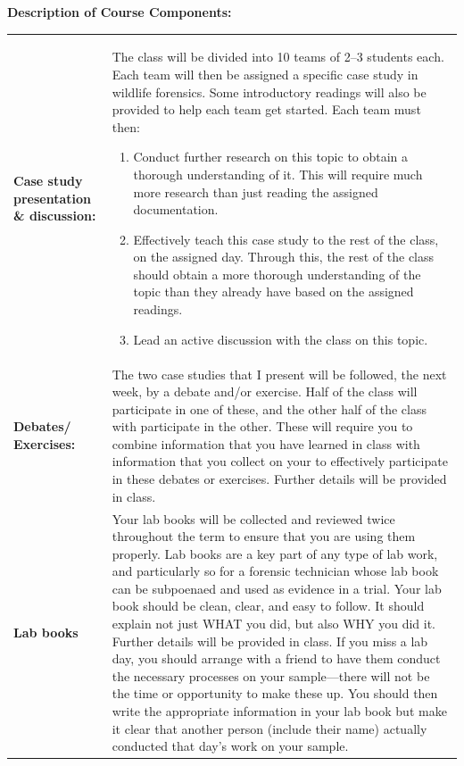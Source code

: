 \documentclass[hidelinks]{article}
\begin{document}
	\newpage
	\textbf{Description of Course Components:}
		\begin{table}[H]
			\begin{tabular}{@{} >{\raggedright}p{2.5cm} p{13.7cm}}
				\textbf{Case study presentation \& discussion:} & The class will be divided into 10 teams of 2--3 students each. Each team will then be assigned a specific case study in wildlife forensics. Some introductory readings will also be provided to help each team get started. Each team must then:
				\begin{enumerate}
					\item Conduct further research on this topic to obtain a thorough understanding of it. This will require much more research than just reading the assigned documentation.
					\item Effectively teach this case study to the rest of the class, on the assigned day. Through this, the rest of the class should obtain a more thorough understanding of the topic than they already have based on the assigned readings.
					\item Lead an active discussion with the class on this topic.
				\end{enumerate}\\
				\addlinespace
				\textbf{Debates/ Exercises:} & The two case studies that I present will be followed, the next week, by a debate and/or exercise. Half of the class will participate in one of these, and the other half of the class with participate in the other. These will require you to combine information that you have learned in class with information that you collect on your to effectively participate in these debates or exercises. Further details will be provided in class.\\
				\addlinespace
				\textbf{Lab books} & Your lab books will be collected and reviewed twice throughout the term to ensure that you are using them properly. Lab books are a key part of any type of lab work, and particularly so for a forensic technician whose lab book can be subpoenaed and used as evidence in a trial. Your lab book should be clean, clear, and easy to follow. It should explain not just WHAT you did, but also WHY you did it. Further details will be provided in class. If you miss a lab day, you should arrange with a friend to have them conduct the necessary processes on your sample---there will not be the time or opportunity to make these up. You should then write the appropriate information in your lab book but make it clear that another person (include their name) actually conducted that day's work on your sample.\\

\end{tabular}
\end{table}
\end{document}

